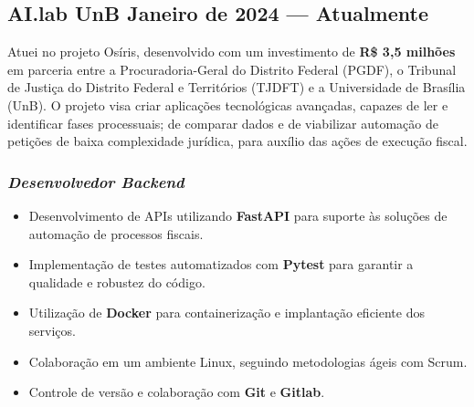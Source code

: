 \documentclass[a4paper,12pt]{article}
\begin{document}







\subsection*{\large AI.lab UnB \hfill Janeiro de 2024 --- Atualmente}


\vspace{0.5em}

Atuei no projeto Osíris, desenvolvido com um investimento de \textbf{R\$ 3,5 milhões} em parceria entre a Procuradoria-Geral do Distrito Federal (PGDF), o Tribunal de Justiça do Distrito Federal e Territórios (TJDFT) e a Universidade de Brasília (UnB).
O projeto visa criar aplicações tecnológicas avançadas, capazes de ler e identificar fases processuais; de comparar dados e de viabilizar automação de petições de baixa complexidade jurídica, para auxílio das ações de execução fiscal. 
\vspace{1em}

\subsubsection*{\small \textit{Desenvolvedor Backend} }
\vspace{-1em}
\vspace{-0.5em}
\begin{itemize}
    \item Desenvolvimento de APIs utilizando \textbf{FastAPI} para suporte às soluções de automação de processos fiscais.
    \item Implementação de testes automatizados com \textbf{Pytest} para garantir a qualidade e robustez do código.
    \item Utilização de \textbf{Docker} para containerização e implantação eficiente dos serviços.
    \item Colaboração em um ambiente Linux, seguindo metodologias ágeis com Scrum.
    \item Controle de versão e colaboração com \textbf{Git} e \textbf{Gitlab}.
\end{itemize}
\end{document}
